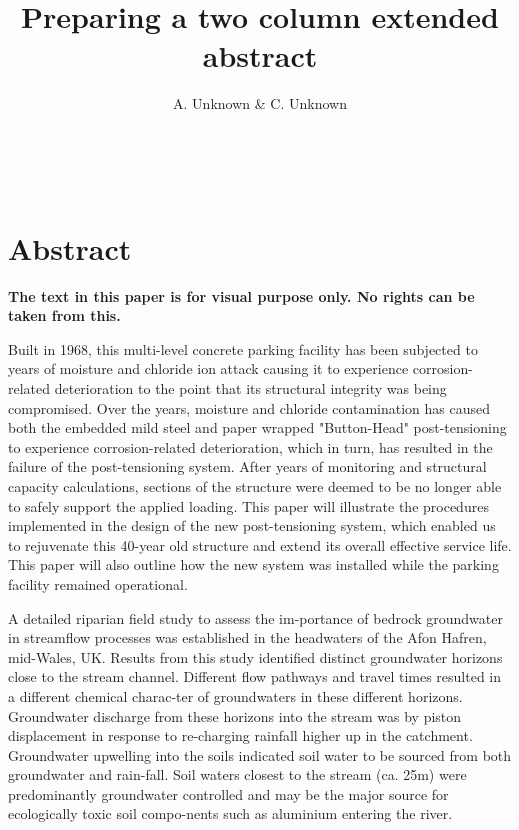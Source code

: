 \documentclass[12pt,a4paper,twocolumn,fleqn]{narms}
\begin{document}
\title{Preparing a two column extended abstract}
\author{{A. Unknown \& C. Unknown} \\
{} \\\\
{}\\
{}
} \maketitle


\section*{Abstract}

{\bf The text in this paper is for visual purpose only. No rights
can be taken from this.}

Built in 1968, this multi-level concrete parking facility has been
subjected to years of moisture and chloride ion attack causing it
to experience corrosion-related deterioration to the point that
its structural integrity was being compromised. Over the years,
moisture and chloride contamination has caused both the embedded
mild steel and paper wrapped "Button-Head" post-tensioning to
experience corrosion-related deterioration, which in turn, has
resulted in the failure of the post-tensioning system.  After
years of monitoring and structural capacity calculations, sections
of the structure were deemed to be no longer able to safely
support the applied loading.  This paper will illustrate the
procedures implemented in the design of the new post-tensioning
system, which enabled us to rejuvenate this 40-year old structure
and extend its overall effective service life.  This paper will
also outline how the new system was installed while the parking
facility remained operational.


A detailed riparian field study to assess the im-portance of
bedrock groundwater in streamflow processes was established in the
headwaters of the Afon Hafren, mid-Wales, UK. Results from this
study identified distinct groundwater horizons close to the stream
channel.  Different flow pathways and travel times resulted in a
different chemical charac-ter of groundwaters in these different
horizons.  Groundwater discharge from these horizons into the
stream was by piston displacement in response to re-charging
rainfall higher up in the catchment.  Groundwater upwelling into
the soils indicated soil water to be sourced from both groundwater
and rain-fall.  Soil waters closest to the stream (ca. 25m) were
predominantly groundwater controlled and may be the major source
for ecologically toxic soil compo-nents such as aluminium entering
the river.
\end{document}
